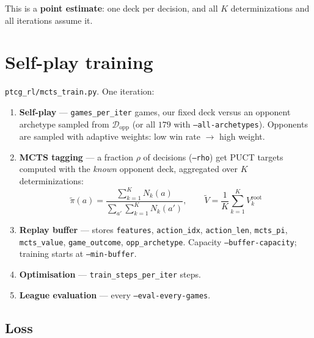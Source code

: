 \documentclass[11pt,a4paper]{article}
\newcommand{\code}[1]{\texttt{\small #1}}
\newcommand{\file}[1]{\texttt{\small #1}}
\begin{document}
\noindent
This is a \textbf{point estimate}: one deck per decision, and all
$K$ determinizations and all iterations assume it.

\section{Self-play training}
\label{sec:training}

\file{ptcg\_rl/mcts\_train.py}. One iteration:

\begin{enumerate}[leftmargin=*]
  \item \textbf{Self-play} --- \code{games\_per\_iter} games, our fixed deck
    versus an opponent archetype sampled from $\mathcal{D}_{\text{opp}}$
    (or all $179$ with \code{--all-archetypes}). Opponents are sampled with
    adaptive weights: low win rate $\to$ high weight.
  \item \textbf{MCTS tagging} --- a fraction $\rho$ of decisions
    (\code{--rho}) get PUCT targets computed with the \emph{known} opponent
    deck, aggregated over $K$ determinizations:
    \begin{equation*}
      \tilde{\pi}(a) = \frac{\sum_{k=1}^{K} N_k(a)}{\sum_{a'}\sum_{k=1}^{K} N_k(a')},
      \qquad
      \tilde{V} = \frac{1}{K}\sum_{k=1}^{K} V_k^{\text{root}}
    \end{equation*}
  \item \textbf{Replay buffer} --- stores \code{features}, \code{action\_idx},
    \code{action\_len}, \code{mcts\_pi}, \code{mcts\_value},
    \code{game\_outcome}, \code{opp\_archetype}. Capacity
    \code{--buffer-capacity}; training starts at \code{--min-buffer}.
  \item \textbf{Optimisation} --- \code{train\_steps\_per\_iter} steps.
  \item \textbf{League evaluation} --- every \code{--eval-every-games}.
\end{enumerate}

\subsection{Loss}
\end{document}
